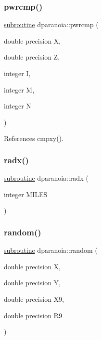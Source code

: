 \mbox{\label{dparanoia_8f90_a99ac19051998d16ab21240c6ea92efa9}} 
\subsubsection{\texorpdfstring{pwrcmp()}{pwrcmp()}}
{\footnotesize\ttfamily \hyperlink{M__stopwatch_83_8txt_acfbcff50169d691ff02d4a123ed70482}{subroutine} dparanoia\+::pwrcmp (\begin{DoxyParamCaption}\item[{double precision}]{X,  }\item[{double precision}]{Z,  }\item[{integer}]{I,  }\item[{integer}]{M,  }\item[{integer}]{N }\end{DoxyParamCaption})}



References cmpxy().

\mbox{\label{dparanoia_8f90_ae90ce15b8c2d18156d500ae21387764d}} 
\subsubsection{\texorpdfstring{radx()}{radx()}}
{\footnotesize\ttfamily \hyperlink{M__stopwatch_83_8txt_acfbcff50169d691ff02d4a123ed70482}{subroutine} dparanoia\+::radx (\begin{DoxyParamCaption}\item[{integer}]{M\+I\+L\+ES }\end{DoxyParamCaption})}

\mbox{\label{dparanoia_8f90_ad92575b76d7d716ba86718803093a1dc}} 
\subsubsection{\texorpdfstring{random()}{random()}}
{\footnotesize\ttfamily \hyperlink{M__stopwatch_83_8txt_acfbcff50169d691ff02d4a123ed70482}{subroutine} dparanoia\+::random (\begin{DoxyParamCaption}\item[{double precision}]{X,  }\item[{double precision}]{Y,  }\item[{double precision}]{X9,  }\item[{double precision}]{R9 }\end{DoxyParamCaption})}

